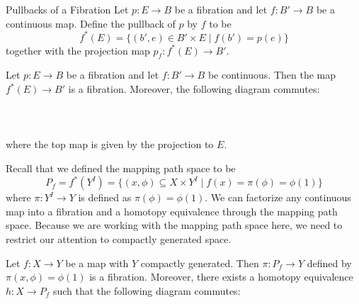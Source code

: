 \documentclass[a4paper]{article}
\begin{document}
\begin{defn}{Pullbacks of a Fibration}{} Let $p:E\to B$ be a fibration and let $f:B'\to B$ be a continuous map. Define the pullback of $p$ by $f$ to be $$f^\ast(E)=\{(b',e)\in B'\times E\;|\;f(b')=p(e)\}$$ together with the projection map $p_f:f^\ast(E)\to B'$. 
\end{defn}

\begin{prp}{}{} Let $p:E\to B$ be a fibration and let $f:B'\to B$ be continuous. Then the map $f^\ast(E)\to B'$ is a fibration. Moreover, the following diagram commutes: \\~\\
\\~\\
where the top map is given by the projection to $E$. 
\end{prp}

Recall that we defined the mapping path space to be $$P_f=f^\ast(Y^I)=\{(x,\phi)\subseteq X\times Y^I\;|\;f(x)=\pi(\phi)=\phi(1)\}$$ where $\pi:Y^I\to Y$ is defined as $\pi(\phi)=\phi(1)$. We can factorize any continuous map into a fibration and a homotopy equivalence through the mapping path space. Because we are working with the mapping path space here, we need to restrict our attention to compactly generated space. 

\begin{thm}{}{} Let $f:X\to Y$ be a map with $Y$ compactly generated. Then $\pi:P_f\to Y$ defined by $\pi(x,\phi)=\phi(1)$ is a fibration. Moreover, there exists a homotopy equivalence $h:X\to P_f$ such that the following diagram commutes: \\~\\
\end{thm}
\end{document}
